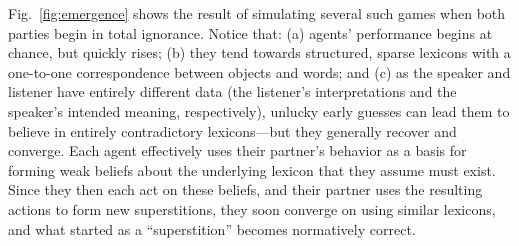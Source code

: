 \documentclass{article} %
\begin{document}
Fig.~\ref{fig:emergence} shows the result of simulating several such
games when both parties begin in total ignorance. Notice that: (a)
agents' performance begins at chance, but quickly rises; (b) they tend
towards structured, sparse lexicons with a one-to-one correspondence
between objects and words; and (c) as the speaker and listener have
entirely different data (the listener's interpretations and the
speaker's intended meaning, respectively), unlucky early guesses can
lead them to believe in entirely contradictory lexicons---but they
generally recover and converge. Each agent effectively uses their
partner's behavior as a basis for forming weak beliefs about the
underlying lexicon that they assume must exist. Since they then each
act on these beliefs, and their partner uses the resulting actions to
form new superstitions, they soon converge on using similar lexicons,
and what started as a ``superstition'' becomes normatively correct.



\end{document}
